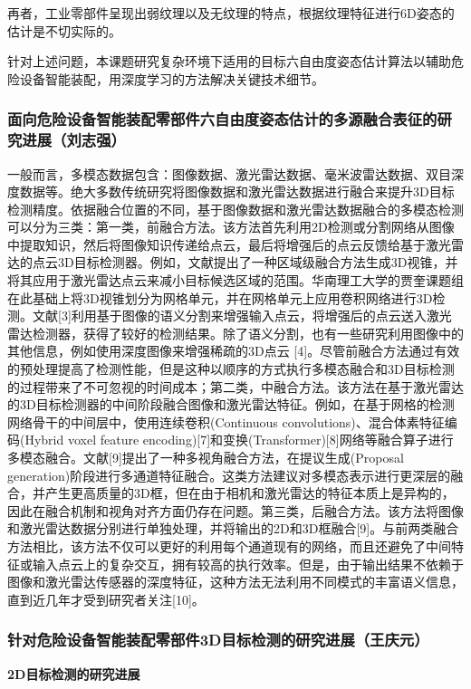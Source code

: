 \documentclass[12pt]{article}
\begin{document}
再者，工业零部件呈现出弱纹理以及无纹理的特点，根据纹理特征进行6D姿态的估计是不切实际的。

针对上述问题，本课题研究复杂环境下适用的目标六自由度姿态估计算法以辅助危险设备智能装配，用深度学习的方法解决关键技术细节。

\subsubsection{面向危险设备智能装配零部件六自由度姿态估计的多源融合表征的研究进展（刘志强）}

一般而言，多模态数据包含：图像数据、激光雷达数据、毫米波雷达数据、双目深度数据等。绝大多数传统研究将图像数据和激光雷达数据进行融合来提升3D目标检测精度。依据融合位置的不同，基于图像数据和激光雷达数据融合的多模态检测可以分为三类：第一类，前融合方法。该方法首先利用2D检测或分割网络从图像中提取知识，然后将图像知识传递给点云，最后将增强后的点云反馈给基于激光雷达的点云3D目标检测器。例如，文献\cite{Peng2019}提出了一种区域级融合方法生成3D视锥，并将其应用于激光雷达点云来减小目标候选区域的范围。华南理工大学的贾奎课题组在此基础上将3D视锥划分为网格单元，并在网格单元上应用卷积网络进行3D检测\cite{Hu2019}。文献[3]利用基于图像的语义分割来增强输入点云，将增强后的点云送入激光雷达检测器，获得了较好的检测结果。除了语义分割，也有一些研究利用图像中的其他信息，例如使用深度图像来增强稀疏的3D点云 [4]。尽管前融合方法通过有效的预处理提高了检测性能，但是这种以顺序的方式执行多模态融合和3D目标检测的过程带来了不可忽视的时间成本；第二类，中融合方法。该方法在基于激光雷达的3D目标检测器的中间阶段融合图像和激光雷达特征。例如，在基于网格的检测网络骨干的中间层中，使用连续卷积(Continuous convolutions)\cite{Park2019,Su2022}、混合体素特征编码(Hybrid voxel feature encoding)[7]和变换(Transformer)[8]网络等融合算子进行多模态融合。文献[9]提出了一种多视角融合方法，在提议生成(Proposal generation)阶段进行多通道特征融合。这类方法建议对多模态表示进行更深层的融合，并产生更高质量的3D框，但在由于相机和激光雷达的特征本质上是异构的，因此在融合机制和视角对齐方面仍存在问题。第三类，后融合方法。该方法将图像和激光雷达数据分别进行单独处理，并将输出的2D和3D框融合[9]。与前两类融合方法相比，该方法不仅可以更好的利用每个通道现有的网络，而且还避免了中间特征或输入点云上的复杂交互，拥有较高的执行效率。但是，由于输出结果不依赖于图像和激光雷达传感器的深度特征，这种方法无法利用不同模式的丰富语义信息，直到近几年才受到研究者关注[10]。

\subsubsection{针对危险设备智能装配零部件3D目标检测的研究进展（王庆元）}
\textbf{2D目标检测的研究进展}
\end{document}
